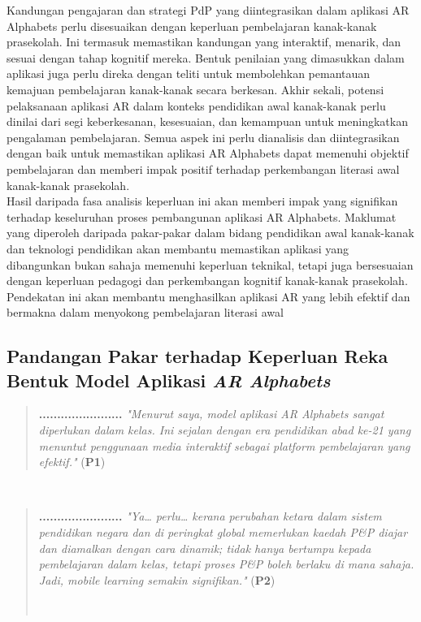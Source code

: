 {{\hspace{1cm}Kandungan pengajaran dan strategi PdP yang diintegrasikan dalam aplikasi AR Alphabets perlu disesuaikan dengan keperluan pembelajaran kanak-kanak prasekolah. Ini termasuk memastikan kandungan yang interaktif, menarik, dan sesuai dengan tahap kognitif mereka. Bentuk penilaian yang dimasukkan dalam aplikasi juga perlu direka dengan teliti untuk membolehkan pemantauan kemajuan pembelajaran kanak-kanak secara berkesan. Akhir sekali, potensi pelaksanaan aplikasi AR dalam konteks pendidikan awal kanak-kanak perlu dinilai dari segi keberkesanan, kesesuaian, dan kemampuan untuk meningkatkan pengalaman pembelajaran. Semua aspek ini perlu dianalisis dan diintegrasikan dengan baik untuk memastikan aplikasi AR Alphabets dapat memenuhi objektif pembelajaran dan memberi impak positif terhadap perkembangan literasi awal kanak-kanak prasekolah.\\


\hspace{1cm}Hasil daripada fasa analisis keperluan ini akan memberi impak yang signifikan terhadap keseluruhan proses pembangunan aplikasi AR Alphabets. Maklumat yang diperoleh daripada pakar-pakar dalam bidang pendidikan awal kanak-kanak dan teknologi pendidikan akan membantu memastikan aplikasi yang dibangunkan bukan sahaja memenuhi keperluan teknikal, tetapi juga bersesuaian dengan keperluan pedagogi dan perkembangan kognitif kanak-kanak prasekolah. Pendekatan ini akan membantu menghasilkan aplikasi AR yang lebih efektif dan bermakna dalam menyokong pembelajaran literasi awal

\subsection{Pandangan Pakar terhadap Keperluan Reka Bentuk Model Aplikasi \textit{AR Alphabets}}

\begin{quote}\begin{center}\textbf{.......................} \textit{"Menurut saya, model aplikasi \textit{AR Alphabets} sangat diperlukan dalam kelas. Ini sejalan dengan era pendidikan abad ke-21 yang menuntut penggunaan media interaktif sebagai platform pembelajaran yang efektif."} (\textbf{P1})\end{center}\end{quote}\\
\begin{quote}
\begin{center}
\textbf{.......................} \textit{"Ya… perlu… kerana perubahan ketara dalam sistem pendidikan negara dan di peringkat global memerlukan kaedah P\&P diajar dan diamalkan dengan cara dinamik; tidak hanya bertumpu kepada pembelajaran dalam kelas, tetapi proses P\&P boleh berlaku di mana sahaja. Jadi, \textit{mobile learning} semakin signifikan."} (\textbf{P2})\end{center}\\
\end{quote}\\

}}
